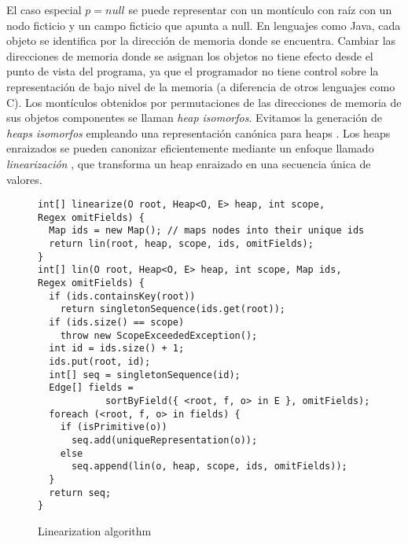 El caso especial $p=null$  se puede representar con un montículo con raíz con un nodo ficticio y un campo ficticio que apunta a null. En lenguajes como Java, cada objeto se identifica por la dirección de memoria donde se encuentra. Cambiar las direcciones de memoria donde se asignan los objetos no tiene efecto desde el punto de vista del programa, ya que el programador no tiene control sobre la representación de bajo nivel de la memoria (a diferencia de otros lenguajes como C). Los montículos obtenidos por permutaciones de las direcciones de memoria de sus objetos componentes se llaman \emph{heap isomorfos}. Evitamos la generación de \emph{heaps isomorfos} empleando una representación canónica para heaps \cite{Iosif02,Boyapati02}. Los heaps enraizados se pueden canonizar eficientemente mediante un enfoque llamado \emph{linearización} \cite{Iosif02,Xie04}, que transforma un heap enraizado en una secuencia única de valores. 

\bigbreak

\begin{figure}[!th]
\begin{lstlisting}
int[] linearize(O root, Heap<O, E> heap, int scope, 
Regex omitFields) {
  Map ids = new Map(); // maps nodes into their unique ids 
  return lin(root, heap, scope, ids, omitFields); 
}
int[] lin(O root, Heap<O, E> heap, int scope, Map ids, 
Regex omitFields) { 
  if (ids.containsKey(root))
    return singletonSequence(ids.get(root)); 
  if (ids.size() == scope) 
    throw new ScopeExceededException();
  int id = ids.size() + 1;
  ids.put(root, id);
  int[] seq = singletonSequence(id);
  Edge[] fields = 
            sortByField({ <root, f, o> in E }, omitFields); 
  foreach (<root, f, o> in fields) {
    if (isPrimitive(o)) 
      seq.add(uniqueRepresentation(o));
    else
      seq.append(lin(o, heap, scope, ids, omitFields));
  }
  return seq; 
}
\end{lstlisting}
\caption{Linearization algorithm}
\label{alg:linearization}
\end{figure}


